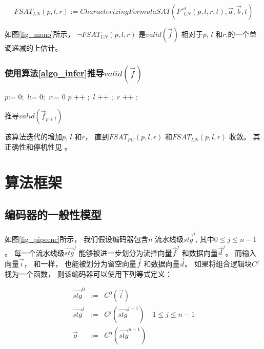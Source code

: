 \begin{equation}\label{fsat_ln}
FSAT_{LN}(p,l,r):=CharacterizingFormulaSAT(F'^d_{LN}(p,l,r,t),\vec{a},\vec{b},t)
\end{equation}

如图\ref{fig_mono}所示，
$\neg FSAT_{LN}(p,l,r)$ 是$valid(\vec{f})$ 相对于$p$, $l$ 和$r$.的一个单调递减的上估计。



\subsubsection{使用算法\ref{algo_infer}推导$valid(\vec{f})$ }\label{subsub_overal}
\begin{algorithm}[t]
\begin{algorithmic}[1]
\STATE $p$:= $0$;~$l$:= $0$;~$r$:= $0$ \;
  \STATE $p$ ++ ;~$l$ ++ ;~$r$ ++ ;
\ENDWHILE
{}
\caption{推导$valid(\vec{f}_{p+l})$}
\label{algo_infer}
\end{algorithmic}
\end{algorithm}

该算法迭代的增加$p$, $l$ 和$r$，
直到$FSAT_{PC}(p,l,r)$ 和$FSAT_{LN}(p,l,r)$ 收敛。
其正确性和停机性见\cite{QinTODAES15} 。


\section{算法框架}\label{sec_framework}


\subsection{编码器的一般性模型}
如图\ref{fig_pipeenc}所示，
我们假设编码器包含$n$ 流水线级$\vec{stg}^j$,
其中$0\le j \le n-1$。
每一个流水线级$\vec{stg}^j$ 能够被进一步划分为流控向量$\vec{f}^j$ 和数据向量$\vec{d}^j$。
而输入向量$\vec{i}$，
和\cite{QinTODAES15}一样，
也能被划分为留空向量$\vec{f}$ 和数据向量$\vec{d}$。
如果将组合逻辑块$C^j$ 视为一个函数，
则该编码器可以使用下列等式定义：

\begin{equation}\label{equ_genpipe}
\begin{array}{cccc}
\vec{stg}^0   & := & C^0(\vec{i})         &\\
\vec{stg}^j   & := & C^j(\vec{stg}^{j-1}) & 1\le j\le n-1\\
\vec{o}       & := & C^n(\vec{stg}^{n-1}) &
\end{array}
\end{equation}


